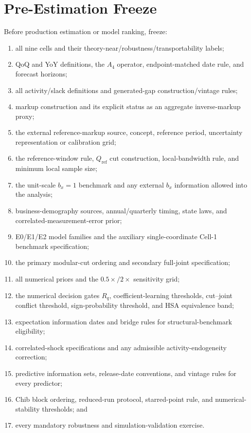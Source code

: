 \documentclass[11pt]{article}
\begin{document}
\section{Pre-Estimation Freeze}

Before production estimation or model ranking, freeze:
\begin{enumerate}
\item all nine cells and their theory-near/robustness/transportability labels;
\item QoQ and YoY definitions, the $A_4$ operator, endpoint-matched date rule, and forecast horizons;
\item all activity/slack definitions and generated-gap construction/vintage rules;
\item markup construction and its explicit status as an aggregate inverse-markup proxy;
\item the external reference-markup source, concept, reference period, uncertainty representation or calibration grid;
\item the reference-window rule, $Q_{\mathrm{ref}}$ cut construction, local-bandwidth rule, and minimum local sample size;
\item the unit-scale $b_x=1$ benchmark and any external $b_x$ information allowed into the analysis;
\item business-demography sources, annual/quarterly timing, state laws, and correlated-measurement-error prior;
\item E0/E1/E2 model families and the auxiliary single-coordinate Cell-1 benchmark specification;
\item the primary modular-cut ordering and secondary full-joint specification;
\item all numerical priors and the $0.5\times/2\times$ sensitivity grid;
\item the numerical decision gates $R_q$, coefficient-learning thresholds, cut--joint conflict threshold, sign-probability threshold, and HSA equivalence band;
\item expectation information dates and bridge rules for structural-benchmark eligibility;
\item correlated-shock specifications and any admissible activity-endogeneity correction;
\item predictive information sets, release-date conventions, and vintage rules for every predictor;
\item Chib block ordering, reduced-run protocol, starred-point rule, and numerical-stability thresholds; and
\item every mandatory robustness and simulation-validation exercise.
\end{enumerate}
\end{document}
